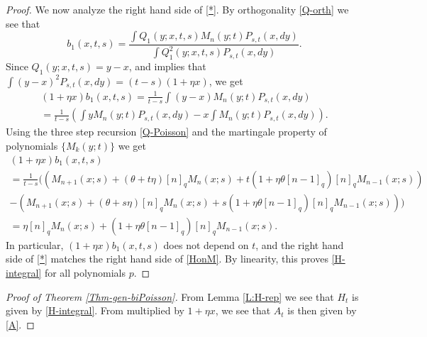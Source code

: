 \documentclass{amsart}
\theoremstyle{definition}
\theoremstyle{remark}
\theoremstyle{remark}
\theoremstyle{definition}
\numberwithin{equation}{section}
\begin{document}
\begin{proof}
We now analyze the right hand side of \eqref{*}.  By orthogonality \eqref{Q-orth} we see that
$$b_1(x,t,s)=\frac{\int Q_1{(y;x,t,s)} M_n(y;t)P_{s,t}(x,dy)}{\int Q_1^2{(y;x,t,s)} P_{s,t}(x,dy)}.$$
Since $Q_1{(y;x,t,s)}=y-x$, and   \cite[(2.27)]{Bryc-Matysiak-Wesolowski-04} implies that $\int (y-x)^2P_{s,t}(x,dy)=(t-s)(1+\eta x)$,
 we get
\begin{multline*}
(1+\eta x)b_1(x,t,s)=\frac{1}{t-s}\int (y-x) M_n(y;t)P_{s,t}(x,dy) \\=
\frac{1}{t-s}\left(\int y M_n(y;t)P_{s,t}(x,dy)-x \int   M_n(y;t)P_{s,t}(x,dy)\right).
\end{multline*} Using the three step recursion \eqref{Q-Poisson} and the martingale property of  polynomials $\{M_k(y;t)\}$ we get
\begin{multline*}
(1+\eta x)b_1(x,t,s)\\=
\frac{1}{t-s}\Big(\left(M_{n+1}(x;s)+(\theta+t\eta)[n]_qM_n(x;s)+t(1+\eta\theta[n-1]_q)[n]_qM_{n-1}(x;s)\right) \\
-
\left(M_{n+1}(x;s)+(\theta+s\eta)[n]_qM_n(x;s)+s(1+\eta\theta[n-1]_q)[n]_qM_{n-1}(x;s)\right)\Big)\\
=
 \eta [n]_qM_n(x;s)+(1+\eta\theta[n-1]_q)[n]_qM_{n-1}(x;s).
\end{multline*} In particular, $(1+\eta x)b_1(x,t,s)$ does not depend on $t$, and the right hand side of \eqref{*}
  matches the right hand side of  \eqref{HonM}. By linearity, this proves \eqref{H-integral} for all polynomials $p$.

\end{proof}

\begin{proof}[Proof of Theorem \ref{Thm-gen-biPoisson}]
From Lemma \ref{L:H-rep} we see that $H_t$ is given by \eqref{H-integral}.
 From \cite[Lemma 2.4]{Bryc-Wesolowski-2013-gener} multiplied by $1+\eta x$,
 we see that $A_t$ is then given by  \eqref{A}.
\end{proof}



\end{document}
